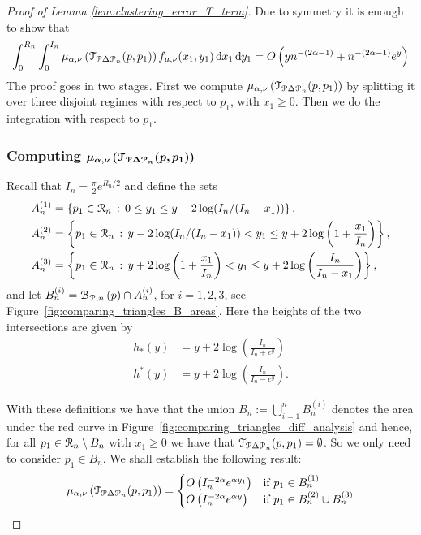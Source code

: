 \begin{proof}[Proof of Lemma \ref{lem:clustering_error_T_term}]
Due to symmetry it is enough to show that
\begin{equation}\label{eq:clustering_error_T_main}
	\int_0^{R_n}\int_0^{I_n} \mu_{\alpha, \nu}\left(\mathcal{T}_{{\mathcal P} \Delta {\mathcal P}_n}(p,p_1)\right) f_{\mu, \nu}(x_1,y_1) 
	\operatorname{\mathrm{d}\hspace{-2pt}} x_1 \operatorname{\mathrm{d}\hspace{-2pt}} y_1 = O\left(y n^{-(2\alpha - 1)} + n^{-(2\alpha-1)} e^{y}\right)
\end{equation}
The proof goes in two stages. First we compute $\mu_{\alpha, \nu}\left(\mathcal{T}_{{\mathcal P} \Delta {\mathcal P}_n}(p,p_1)\right)$ by splitting it over three disjoint regimes with respect to $p_1$, with $x_1 \ge 0$. Then we do the integration with respect to $p_1$.

\subsubsection*{Computing $\bm{\mu_{\alpha, \nu}\left(\mathcal{T}_{{\mathcal P} \Delta {\mathcal P}_n}(p,p_1)\right)}$}

Recall that $I_n = \frac{\pi}{2} e^{R_n/2}$ and define the sets
\begin{align*}
	A_n^{(1)} &= \left\{p_1 \in {\mathcal R}_n \, : \, 0 \le y_1 \le y - 2\log(I_n/(I_n-x_1)) \right\},\\
	A_n^{(2)} &= \left\{p_1 \in {\mathcal R}_n \, : \, y - 2\log(I_n/(I_n-x_1)) < y_1 
		\le y + 2 \log\left(1 + \frac{x_1}{I_n}\right)\right\},\\
	A_n^{(3)} &= \left\{p_1 \in {\mathcal R}_n \, : \, y + 2 \log\left(1 + \frac{x_1}{I_n}\right) < y_1 
			\le y + 2 \log\left(\frac{I_n}{I_n-x_1}\right)\right\},
\end{align*}
and let $B_n^{(i)} = {\mathcal B}_{{\mathcal P},n}\left(p\right) \cap A_n^{(i)}$, for $i = 1, 2, 3$, see Figure~\ref{fig:comparing_triangles_B_areas}. Here the heights of the two intersections are given by
\begin{align}
	h_\ast(y) &= y + 2 \log\left(\frac{I_n}{I_n + e^y}\right)\\
	h^\ast(y) &= y + 2 \log\left(\frac{I_n}{I_n - e^y}\right).
\end{align}

With these definitions we have that the union $B_n := \bigcup_{i = 1}^n B_n^{(i)}$ denotes the area under the red curve in Figure~\ref{fig:comparing_triangles_diff_analysis} and hence, for all $p_1 \in {\mathcal R}_n\setminus B_n$ with $x_1 \ge 0$ we have that $\mathcal{T}_{{\mathcal P} \Delta {\mathcal P}_n}(p,p_1) = \emptyset$. So we only need to consider $p_1 \in B_n$. We shall establish the following result:
\begin{equation}\label{eq:mu_triangle_diff}
	\mu_{\alpha, \nu}\left(\mathcal{T}_{{\mathcal P} \Delta {\mathcal P}_n}(p,p_1)\right) = 
	\begin{cases}
		O\left(I_n^{-2\alpha} e^{\alpha y_1}\right) &\mbox{if } p_1 \in B_n^{(1)}\\
		O\left(I_n^{-2\alpha} e^{\alpha y}\right) &\mbox{if } p_1 \in B_n^{(2)} \cup B_n^{(3)}
	\end{cases}
\end{equation}


\end{proof}
